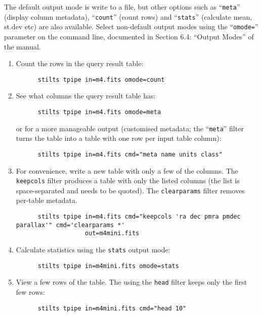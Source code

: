 \documentclass{article}
\begin{document}
The default output mode is write to a file,
but other options such as ``{\tt meta}'' (display column metadata),
``{\tt count}'' (count rows) and ``{\tt stats}'' (calculate mean, st.dev etc)
are also available.
Select non-default output modes using the ``{\tt omode=}'' parameter
on the command line, documented in Section 6.4: ``Output Modes'' of the manual.

\begin{enumerate}
\item Count the rows in the query result table:
      \preverb
      \begin{verbatim}
      stilts tpipe in=m4.fits omode=count
      \end{verbatim}
      \postverb
\item See what columns the query result table has:
      \preverb
      \begin{verbatim}
      stilts tpipe in=m4.fits omode=meta
      \end{verbatim}
      \postverb
      or for a more manageable output
      (customised metadata; the ``{\tt meta}'' filter turns the table
      into a table with one row per input table column):
      \preverb
      \begin{verbatim}
      stilts tpipe in=m4.fits cmd="meta name units class"
      \end{verbatim}
      \postverb
\item For convenience, write a new table with only a few of the columns.
      The {\tt keepcols} filter produces a table with only the listed
      columns (the list is space-separated and needs to be quoted).
      The {\tt clearparams} filter removes per-table metadata.
      \preverb
      \begin{verbatim}
      stilts tpipe in=m4.fits cmd="keepcols 'ra dec pmra pmdec parallax'" cmd='clearparams *'
                   out=m4mini.fits
      \end{verbatim}
      \postverb
\item Calculate statistics using the {\tt stats} output mode:
      \preverb
      \begin{verbatim}
      stilts tpipe in=m4mini.fits omode=stats
      \end{verbatim}
      \postverb
\item View a few rows of the table.
      The using the {\tt head} filter keeps only the first few rows:
      \preverb
      \begin{verbatim}
      stilts tpipe in=m4mini.fits cmd="head 10"
      \end{verbatim}

\end{enumerate}
\end{document}
